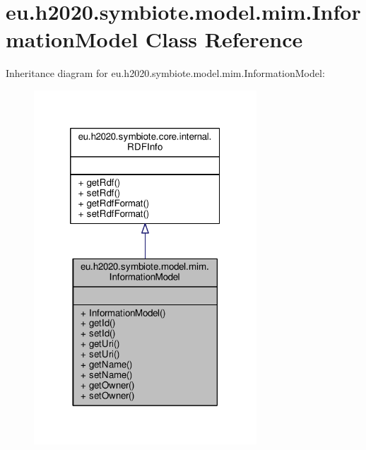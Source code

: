 \hypertarget{classeu_1_1h2020_1_1symbiote_1_1model_1_1mim_1_1InformationModel}{}\section{eu.\+h2020.\+symbiote.\+model.\+mim.\+Information\+Model Class Reference}
\label{classeu_1_1h2020_1_1symbiote_1_1model_1_1mim_1_1InformationModel}


Inheritance diagram for eu.\+h2020.\+symbiote.\+model.\+mim.\+Information\+Model\+:
\nopagebreak
\begin{figure}[H]
\begin{center}
\leavevmode
\includegraphics[width=236pt]{classeu_1_1h2020_1_1symbiote_1_1model_1_1mim_1_1InformationModel__inherit__graph}
\end{center}
\end{figure}


